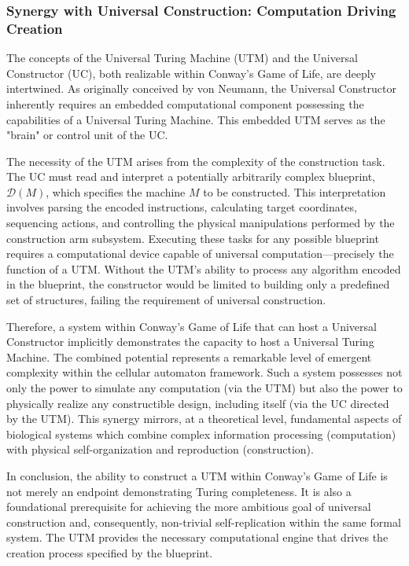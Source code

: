 \documentclass{article}
\theoremstyle{definition}
\theoremstyle{plain}
\theoremstyle{plain}
\begin{document}
\subsubsection{Synergy with Universal Construction: Computation Driving Creation}
The concepts of the Universal Turing Machine (UTM) and the Universal Constructor (UC), both realizable within Conway's Game of Life, are deeply intertwined. As originally conceived by von Neumann, the Universal Constructor inherently requires an embedded computational component possessing the capabilities of a Universal Turing Machine. This embedded UTM serves as the "brain" or control unit of the UC.

The necessity of the UTM arises from the complexity of the construction task. The UC must read and interpret a potentially arbitrarily complex blueprint, $\mathcal{D}(M)$, which specifies the machine $M$ to be constructed. This interpretation involves parsing the encoded instructions, calculating target coordinates, sequencing actions, and controlling the physical manipulations performed by the construction arm subsystem. Executing these tasks for any possible blueprint requires a computational device capable of universal computation—precisely the function of a UTM. Without the UTM's ability to process any algorithm encoded in the blueprint, the constructor would be limited to building only a predefined set of structures, failing the requirement of universal construction.

Therefore, a system within Conway's Game of Life that can host a Universal Constructor implicitly demonstrates the capacity to host a Universal Turing Machine. The combined potential represents a remarkable level of emergent complexity within the cellular automaton framework. Such a system possesses not only the power to simulate any computation (via the UTM) but also the power to physically realize any constructible design, including itself (via the UC directed by the UTM). This synergy mirrors, at a theoretical level, fundamental aspects of biological systems which combine complex information processing (computation) with physical self-organization and reproduction (construction).

In conclusion, the ability to construct a UTM within Conway's Game of Life is not merely an endpoint demonstrating Turing completeness. It is also a foundational prerequisite for achieving the more ambitious goal of universal construction and, consequently, non-trivial self-replication within the same formal system. The UTM provides the necessary computational engine that drives the creation process specified by the blueprint.
\end{document}
